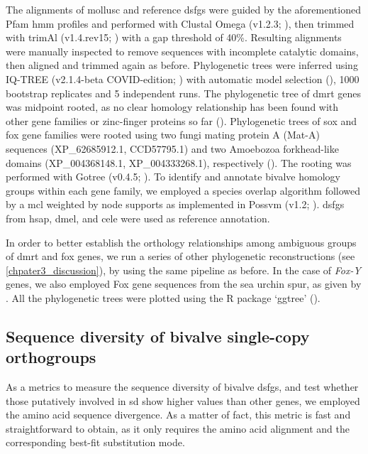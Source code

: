 The alignments of mollusc and reference \glspl{dsfg} were guided by the aforementioned Pfam \gls{hmm} profiles and performed with Clustal Omega (v1.2.3; ), then trimmed with trimAl (v1.4.rev15; ) with a gap threshold of 40\%. Resulting alignments were manually inspected to remove sequences with incomplete catalytic domains, then aligned and trimmed again as before. Phylogenetic trees were inferred using IQ-TREE (v2.1.4-beta COVID-edition; ) with automatic model selection (), 1000 bootstrap replicates and 5 independent runs. The phylogenetic tree of \gls{dmrt} genes was midpoint rooted, as no clear homology relationship has been found with other gene families or zinc-finger proteins so far (). Phylogenetic trees of \gls{sox} and \gls{fox} gene families were rooted using two fungi mating protein A (Mat-A) sequences (XP\_62685912.1, CCD57795.1) and two Amoebozoa forkhead-like domains (XP\_004368148.1, XP\_004333268.1), respectively (). The rooting was performed with Gotree (v0.4.5; ). To identify and annotate bivalve homology groups within each gene family, we employed a species overlap algorithm followed by a \gls{mcl} weighted by node supports as implemented in Possvm (v1.2; ). \glspl{dsfg} from \gls{hsap}, \gls{dmel}, and \gls{cele} were used as reference annotation.

In order to better establish the orthology relationships among ambiguous groups of \gls{dmrt} and \gls{fox} genes, we run a series of other phylogenetic reconstructions (see \cref{chpater3_discussion}), by using the same pipeline as before. In the case of \textit{Fox-Y} genes, we also employed Fox gene sequences from the sea urchin \gls{spur}, as given by . All the phylogenetic trees were plotted using the R package ‘ggtree’ ().

\subsection{Sequence diversity of bivalve single-copy orthogroups}
As a metrics to measure the sequence diversity of bivalve \glspl{dsfg}, and test whether those putatively involved in \gls{sd} show higher values than other genes, we employed the amino acid sequence divergence. As a matter of fact, this metric is fast and straightforward to obtain, as it only requires the amino acid alignment and the corresponding best-fit substitution mode.

